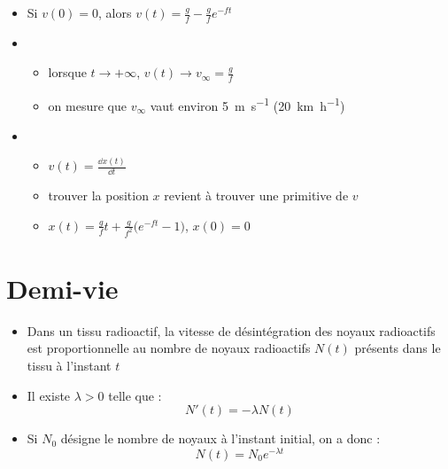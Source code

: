 \begin{frame}
\begin{itemize}
  \item {}
  \pause
  Si $v(0)=0$, alors $\displaystyle v(t)=\frac{g}{f}-\frac{g}{f}e^{-ft}$

   \pause\vspace*{-1ex} 
  

  \pause\vspace*{-1ex}
  
  \item {}
  \pause
  \begin{itemize}
    \item lorsque $t\to+\infty$, $v(t) \to v_\infty = \frac{g}{f}$
    \pause
    \item on mesure que $v_\infty$ vaut environ \SI{5}{\meter\per\second} (\SI{20}{\kilo\meter\per\hour})
  \end{itemize}
  
  \pause
  \item {}
  \begin{itemize}
  \pause
    \item $v(t) = \frac{\dd x(t)}{\dd t}$
    \pause
    \item trouver la position $x$ revient à trouver une primitive de $v$
    \pause
    \item $x(t) = \frac{g}{f} t + \frac{g}{f^2}\big(e^{-ft}-1\big)$, $x(0)=0$
  \end{itemize}
\end{itemize}
\end{frame}



\section*{Demi-vie}

\begin{frame}

\pause

\begin{itemize}
  \item Dans un tissu radioactif, la vitesse de désintégration des noyaux radioactifs 
est proportionnelle au nombre de noyaux radioactifs $N(t)$ présents dans le
tissu à l'instant $t$
  \pause
  \item Il existe $\lambda>0$ telle que :
$$N'(t) = -\lambda N(t)$$


\pause
  \item Si $N_0$ désigne le nombre de noyaux à l'instant initial, on a donc :
$$N(t) = N_0 e^{-\lambda t}$$
\end{itemize}
\vspace*{-2ex}\pause
\end{frame}


